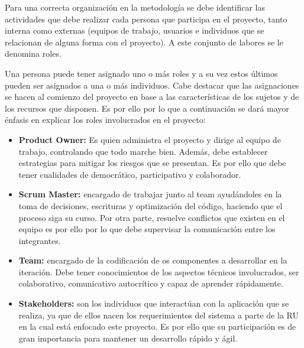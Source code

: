Para una correcta organización en la metodología se debe identificar las actividades que debe realizar cada persona que participa en el proyecto, tanto interna como externas (equipos de trabajo, usuarios e individuos que se relacionan de alguna forma con el proyecto). A este conjunto de labores se le denomina roles.

Una persona puede tener asignado uno o más roles y a su vez estos últimos pueden ser asignados a una o más individuos. Cabe destacar que las asignaciones se hacen al comienzo del proyecto en base a las características de los sujetos y de los recursos que disponen. Es por ello por lo que a continuación se dará mayor énfasis en explicar los roles involucrados en el proyecto:

\begin{itemize}
    \item \textbf{Product Owner:}  Es quien administra el proyecto y dirige al equipo de trabajo, controlando que todo marche bien. Además, debe establecer estrategias para mitigar los riesgos que se presentan. Es por ello que debe tener cualidades de democrático, participativo y colaborador.
    \item \textbf{Scrum Master: } encargado de trabajar junto al team ayudándoles en la toma de decisiones, escrituras y optimización del código, haciendo que el proceso siga su curso. Por otra parte, resuelve conflictos que existen en el equipo es por ello por lo que debe supervisar la comunicación entre los integrantes.
    \item \textbf{Team: } encargado de la codificación de os componentes a desarrollar en la iteración. Debe tener conocimientos de los aspectos técnicos involucrados, ser colaborativo, comunicativo autocrítico y capaz de aprender rápidamente.
    \item \textbf{Stakeholders: } son los individuos que interactúan con la aplicación que se realiza, ya que de ellos nacen los requerimientos del sistema a parte de  la RU en la cual está enfocado este proyecto. Es por ello que su participación es de gran importancia para mantener un desarrollo rápido y ágil.
\end{itemize}




